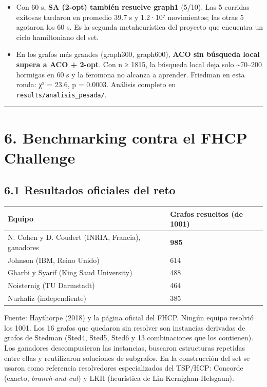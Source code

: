 \documentclass[
  spanish,
  12pt,
]{article}
\newcounter{none} %
\providecommand{\tightlist}{%
  \setlength{\itemsep}{0pt}\setlength{\parskip}{0pt}}
\begin{document}
\begin{itemize}
\tightlist
\item
  Con 60 s, \textbf{SA (2-opt) también resuelve graph1} (5/10). Las 5
  corridas exitosas tardaron en promedio 39.7 s y 1.2·10⁷ movimientos;
  las otras 5 agotaron los 60 s. Es la segunda metaheurística del
  proyecto que encuentra un ciclo hamiltoniano del set.
\item
  En los grafos más grandes (graph300, graph600), \textbf{ACO sin
  búsqueda local supera a ACO + 2-opt}. Con n ≥ 1815, la búsqueda local
  deja solo \textasciitilde70--200 hormigas en 60 s y la feromona no
  alcanza a aprender. Friedman en esta ronda: χ² = 23.6, p = 0.0003.
  Análisis completo en \texttt{results/analisis\_pesada/}.
\end{itemize}

\begin{center}\rule{0.5\linewidth}{0.5pt}\end{center}

\section{6. Benchmarking contra el FHCP
Challenge}\label{benchmarking-contra-el-fhcp-challenge}

\subsection{6.1 Resultados oficiales del
reto}\label{resultados-oficiales-del-reto}

{\def\LTcaptype{none} %
\begin{longtable}[]{@{}ll@{}}
\toprule\noalign{}
Equipo & Grafos resueltos (de 1001) \\
\midrule\noalign{}
\endhead
\bottomrule\noalign{}
\endlastfoot
N. Cohen y D. Coudert (INRIA, Francia), ganadores & \textbf{985} \\
Johnson (IBM, Reino Unido) & 614 \\
Gharbi y Syarif (King Saud University) & 488 \\
Noisternig (TU Darmstadt) & 464 \\
Nurhafiz (independiente) & 385 \\
\end{longtable}
}

Fuente: Haythorpe (2018) y la página oficial del FHCP. Ningún equipo
resolvió los 1001. Los 16 grafos que quedaron sin resolver son
instancias derivadas de grafos de Stedman (Sted4, Sted5, Sted6 y 13
combinaciones que los contienen). Los ganadores descompusieron las
instancias, buscaron estructuras repetidas entre ellas y reutilizaron
soluciones de subgrafos. En la construcción del set se usaron como
referencia resolvedores especializados del TSP/HCP: Concorde (exacto,
\emph{branch-and-cut}) y LKH (heurística de Lin-Kernighan-Helsgaun).
\end{document}
